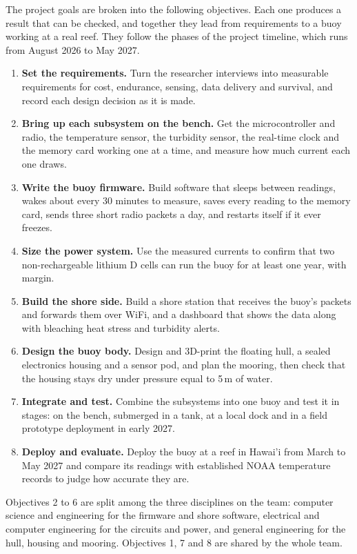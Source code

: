 The project goals are broken into the following objectives. Each one produces a result that can be checked, and together they lead from requirements to a buoy working at a real reef. They follow the phases of the project timeline, which runs from August 2026 to May 2027.
\begin{enumerate}
    \item \textbf{Set the requirements.} Turn the researcher interviews into measurable requirements for cost, endurance, sensing, data delivery and survival, and record each design decision as it is made.
    \item \textbf{Bring up each subsystem on the bench.} Get the microcontroller and radio, the temperature sensor, the turbidity sensor, the real-time clock and the memory card working one at a time, and measure how much current each one draws.
    \item \textbf{Write the buoy firmware.} Build software that sleeps between readings, wakes about every 30 minutes to measure, saves every reading to the memory card, sends three short radio packets a day, and restarts itself if it ever freezes.
    \item \textbf{Size the power system.} Use the measured currents to confirm that two non-rechargeable lithium D cells can run the buoy for at least one year, with margin.
    \item \textbf{Build the shore side.} Build a shore station that receives the buoy's packets and forwards them over WiFi, and a dashboard that shows the data along with bleaching heat stress and turbidity alerts.
    \item \textbf{Design the buoy body.} Design and 3D-print the floating hull, a sealed electronics housing and a sensor pod, and plan the mooring, then check that the housing stays dry under pressure equal to 5\,m of water.
    \item \textbf{Integrate and test.} Combine the subsystems into one buoy and test it in stages: on the bench, submerged in a tank, at a local dock and in a field prototype deployment in early 2027.
    \item \textbf{Deploy and evaluate.} Deploy the buoy at a reef in Hawai'i from March to May 2027 and compare its readings with established NOAA temperature records to judge how accurate they are.
\end{enumerate}
Objectives 2 to 6 are split among the three disciplines on the team: computer science and engineering for the firmware and shore software, electrical and computer engineering for the circuits and power, and general engineering for the hull, housing and mooring. Objectives 1, 7 and 8 are shared by the whole team.

